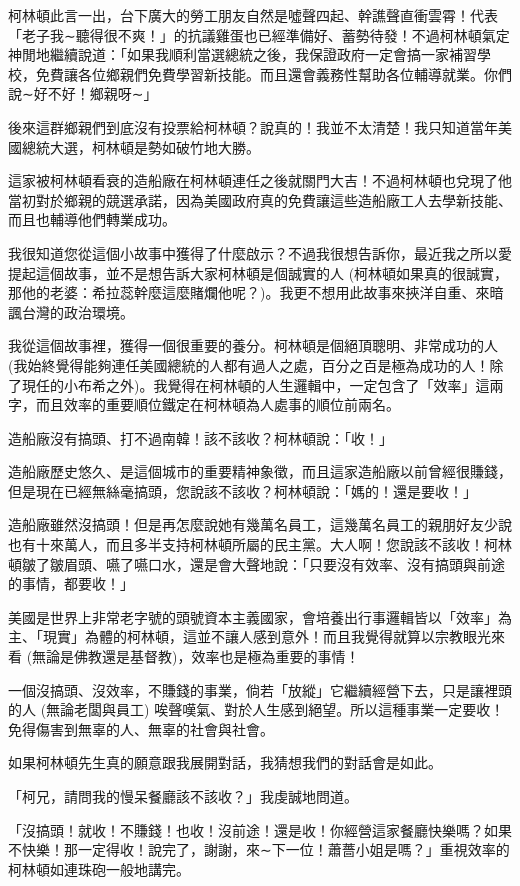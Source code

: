 柯林頓此言一出，台下廣大的勞工朋友自然是噓聲四起、幹譙聲直衝雲霄！代表「老子我∼聽得很不爽！」的抗議雞蛋也已經準備好、蓄勢待發！不過柯林頓氣定神閒地繼續說道：「如果我順利當選總統之後，我保證政府一定會搞一家補習學校，免費讓各位鄉親們免費學習新技能。而且還會義務性幫助各位輔導就業。你們說∼好不好！鄉親呀∼」

後來這群鄉親們到底沒有投票給柯林頓？說真的！我並不太清楚！我只知道當年美國總統大選，柯林頓是勢如破竹地大勝。

這家被柯林頓看衰的造船廠在柯林頓連任之後就關門大吉！不過柯林頓也兌現了他當初對於鄉親的競選承諾，因為美國政府真的免費讓這些造船廠工人去學新技能、而且也輔導他們轉業成功。

我很知道您從這個小故事中獲得了什麼啟示？不過我很想告訴你，最近我之所以愛提起這個故事，並不是想告訴大家柯林頓是個誠實的人 (柯林頓如果真的很誠實，那他的老婆：希拉蕊幹麼這麼賭爛他呢？)。我更不想用此故事來挾洋自重、來暗諷台灣的政治環境。

我從這個故事裡，獲得一個很重要的養分。柯林頓是個絕頂聰明、非常成功的人 (我始終覺得能夠連任美國總統的人都有過人之處，百分之百是極為成功的人！除了現任的小布希之外)。我覺得在柯林頓的人生邏輯中，一定包含了「效率」這兩字，而且效率的重要順位鐵定在柯林頓為人處事的順位前兩名。

造船廠沒有搞頭、打不過南韓！該不該收？柯林頓說：「收！」

造船廠歷史悠久、是這個城市的重要精神象徵，而且這家造船廠以前曾經很賺錢，但是現在已經無絲毫搞頭，您說該不該收？柯林頓說：「媽的！還是要收！」

造船廠雖然沒搞頭！但是再怎麼說她有幾萬名員工，這幾萬名員工的親朋好友少說也有十來萬人，而且多半支持柯林頓所屬的民主黨。大人啊！您說該不該收！柯林頓皺了皺眉頭、嚥了嚥口水，還是會大聲地說：「只要沒有效率、沒有搞頭與前途的事情，都要收！」

美國是世界上非常老字號的頭號資本主義國家，會培養出行事邏輯皆以「效率」為主、「現實」為體的柯林頓，這並不讓人感到意外！而且我覺得就算以宗教眼光來看 (無論是佛教還是基督教)，效率也是極為重要的事情！

一個沒搞頭、沒效率，不賺錢的事業，倘若「放縱」它繼續經營下去，只是讓裡頭的人 (無論老闆與員工) 唉聲嘆氣、對於人生感到絕望。所以這種事業一定要收！免得傷害到無辜的人、無辜的社會與社會。

如果柯林頓先生真的願意跟我展開對話，我猜想我們的對話會是如此。

「柯兄，請問我的慢呆餐廳該不該收？」我虔誠地問道。

「沒搞頭！就收！不賺錢！也收！沒前途！還是收！你經營這家餐廳快樂嗎？如果不快樂！那一定得收！說完了，謝謝，來∼下一位！蕭薔小姐是嗎？」重視效率的柯林頓如連珠砲一般地講完。

